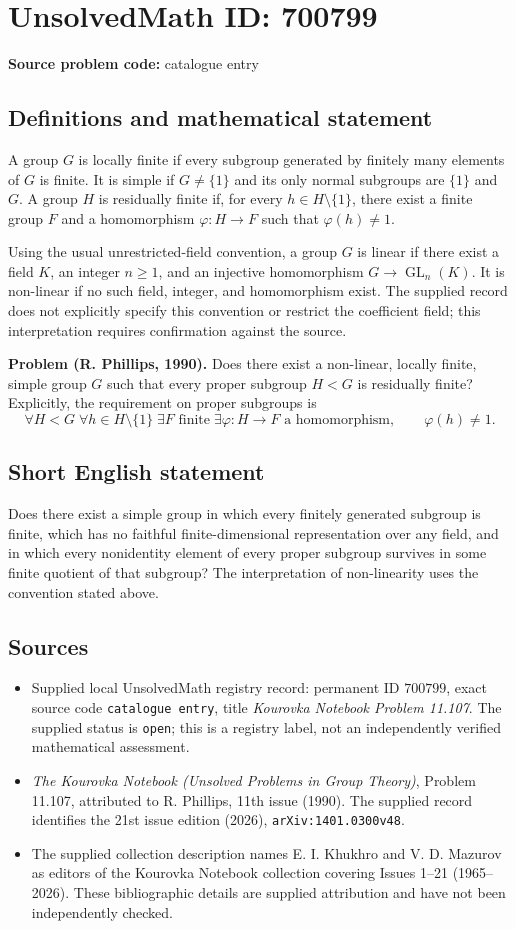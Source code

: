 \documentclass[11pt]{article}
\begin{document}
\section*{UnsolvedMath ID: 700799}
\textbf{Source problem code:} catalogue entry
\subsection{Definitions and mathematical statement}
A group \(G\) is locally finite if every subgroup generated by finitely many elements of \(G\) is finite. It is simple if \(G\neq\{1\}\) and its only normal subgroups are \(\{1\}\) and \(G\). A group \(H\) is residually finite if, for every \(h\in H\setminus\{1\}\), there exist a finite group \(F\) and a homomorphism \(\varphi:H\to F\) such that \(\varphi(h)\neq 1\).

Using the usual unrestricted-field convention, a group \(G\) is linear if there exist a field \(K\), an integer \(n\geq 1\), and an injective homomorphism \(G\to\operatorname{GL}_n(K)\). It is non-linear if no such field, integer, and homomorphism exist. The supplied record does not explicitly specify this convention or restrict the coefficient field; this interpretation requires confirmation against the source.

\textbf{Problem (R. Phillips, 1990).} Does there exist a non-linear, locally finite, simple group \(G\) such that every proper subgroup \(H<G\) is residually finite? Explicitly, the requirement on proper subgroups is
\[
\forall H<G\;\forall h\in H\setminus\{1\}\;\exists F\text{ finite}\;\exists\varphi:H\to F\text{ a homomorphism},\qquad \varphi(h)\neq 1.
\]
\subsection{Short English statement}
Does there exist a simple group in which every finitely generated subgroup is finite, which has no faithful finite-dimensional representation over any field, and in which every nonidentity element of every proper subgroup survives in some finite quotient of that subgroup? The interpretation of non-linearity uses the convention stated above.
\subsection{Sources}
\begin{itemize}
\item Supplied local UnsolvedMath registry record: permanent ID \(700799\), exact source code \texttt{catalogue entry}, title \emph{Kourovka Notebook Problem 11.107}. The supplied status is \texttt{open}; this is a registry label, not an independently verified mathematical assessment.
\item \emph{The Kourovka Notebook (Unsolved Problems in Group Theory)}, Problem 11.107, attributed to R. Phillips, 11th issue (1990). The supplied record identifies the 21st issue edition (2026), \texttt{arXiv:1401.0300v48}.
\item The supplied collection description names E. I. Khukhro and V. D. Mazurov as editors of the Kourovka Notebook collection covering Issues 1--21 (1965--2026). These bibliographic details are supplied attribution and have not been independently checked.
\end{itemize}
\end{document}
